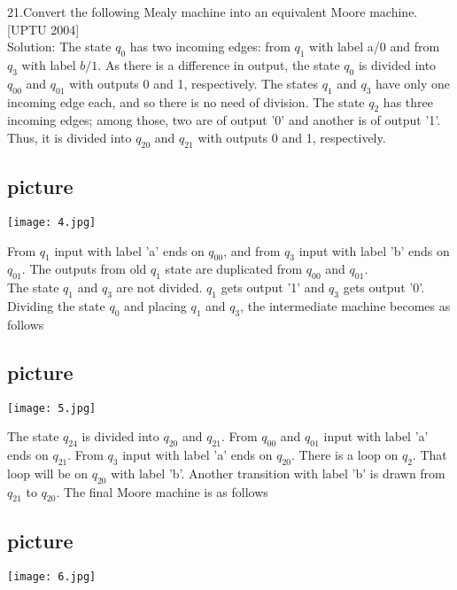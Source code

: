 \documentclass{article}
\begin{document}
  \vspace*{0.5cm}
  \small{
\begin{multicols}{2}
21.Convert the following Mealy machine into an equivalent Moore machine. [UPTU 2004]\\
Solution: The state $q_0$ has two incoming edges: from $q_1$ with label a/0 and from $q_3$ with label $b/1$. As there is a difference in output, the state $q_0$ is divided into $q_00$ and $q_01$ with outputs 0 and 1, respectively. The states $q_1$ and $q_3$ have only one incoming edge each, and so there is no need of division. The state $q_2$ has three incoming edges; among those, two are of output '0' and another is of output '1'. Thus, it is divided into $q_20$ and $q_21$ with outputs 0 and 1, respectively.

\begin{center}
\section{picture}
\texttt{[image: 4.jpg]}
\end{center}
\end{multicols}
}

From $q_1$ input with label 'a' ends on $q_00$, and from $q_3$ input with label 'b' ends on $q_01$. The outputs from old $q_1$ state are duplicated from $q_00$ and $q_01$.\\
The state $q_1$ and $q_3$ are not divided. $q_1$ gets output '1' and $q_3$ gets output '0'.
Dividing the state $q_0$ and placing $q_1$ and $q_3$, the intermediate machine becomes as follows\\
\begin{center}
\section{picture}
\texttt{[image: 5.jpg]}
\end{center}

The state $q_24$ is divided into $q_20$ and $q_21$. From $q_00$ and $q_01$ input with label 'a' ends on $q_21$. From $q_3$ input with label 'a' ends on $q_20$. There is a loop on $q_2$. That loop will be on $q_20$ with label 'b'. Another transition with label 'b' is drawn from $q_21$ to $q_20$. The final Moore machine is as follows\\
\begin{center}
\section{picture}
\texttt{[image: 6.jpg]}
\end{center}
\end{document}
